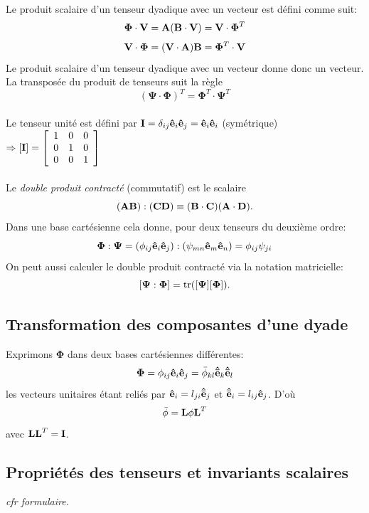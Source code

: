 \paragraph{}
Le produit scalaire d'un tenseur dyadique avec un vecteur  est défini comme suit:
$$\mathbf{\Phi}\cdot\textbf{V} = \textbf{A}(\textbf{B}\cdot\textbf{V})=\textbf{V}\cdot\mathbf{\Phi}^T$$
$$\textbf{V}\cdot\mathbf{\Phi} = (\textbf{V}\cdot\textbf{A})\textbf{B}=\mathbf{\Phi}^T\cdot\textbf{V}$$
Le produit scalaire d'un tenseur dyadique avec un vecteur donne donc un vecteur. La transposée du produit de tenseurs suit la règle $$(\mathbf{\Psi}\cdot\mathbf{\Phi})^T=\mathbf{\Phi}^T\cdot\mathbf{\Psi}^T$$
\paragraph{}
Le tenseur unité est défini par $\textbf{I}=\delta_{ij}\textbf{ê}_i\textbf{ê}_j=\textbf{ê}_i\textbf{ê}_i$ (symétrique) $\Rightarrow [\textbf{I}]=\left[\begin{array}{ccc}
1&0&0\\
0&1&0 \\
0&0&1
\end{array}\right]$
\paragraph{}
Le \emph{double produit contracté} (commutatif) est le scalaire $$(\textbf{AB}):(\textbf{CD})\equiv (\textbf{B}\cdot\textbf{C})(\textbf{A}\cdot\textbf{D}).$$
Dans une base cartésienne cela donne, pour deux tenseurs du deuxième ordre:
$$\mathbf{\Phi}:\mathbf{\Psi}=(\phi_{ij}\textbf{ê}_i\textbf{ê}_j):(\psi_{mn}\textbf{ê}_m\textbf{ê}_n)=\phi_{ij}\psi_{ji}$$
On peut aussi calculer le double produit contracté via la notation matricielle:
$$[\mathbf{\Psi}:\mathbf{\Phi}]=\operatorname{tr}([\mathbf{\Psi}][\mathbf{\Phi}]).$$

\subsection{Transformation des composantes d'une dyade}
Exprimons $\mathbf{\Phi}$ dans deux bases cartésiennes différentes: $$\mathbf{\Phi}=\phi_{ij}\textbf{ê}_i\textbf{ê}_j=\bar{\phi}_{kl}\mathbf{\hat{\bar{e}}}_k\mathbf{\hat{\bar{e}}}_l$$ les vecteurs unitaires étant reliés par $\textbf{ê}_i=l_{ji}\mathbf{\hat{\bar{e}}}_j$ et $\mathbf{\hat{\bar{e}}}_i =l_{ij}\textbf{ê}_j$. D'où
$$\bar{\phi}=\textbf{L}\phi\textbf{L}^T$$ avec $\textbf{L}\textbf{L}^T=\textbf{I}$.

\subsection{Propriétés des tenseurs et invariants scalaires}
\emph{cfr formulaire.}
